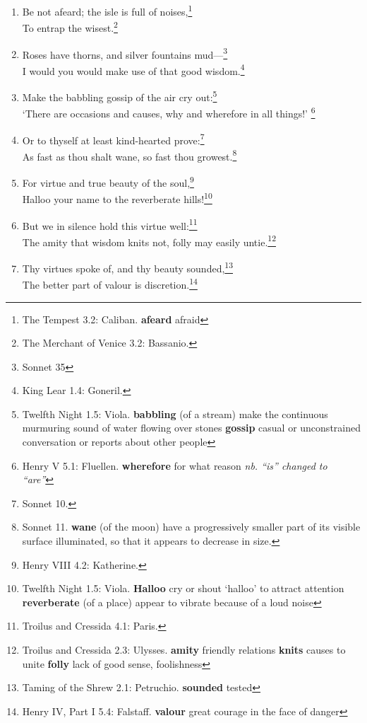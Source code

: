 \documentclass[17pt,twoside]{extarticle}
\begin{document}
\begin{enumerate}
  in such a temple.\footnote{The Tempest 1.2: Miranda.}
\item
  Be not afeard; the isle is full of noises,\footnote{The Tempest 3.2:
    Caliban. \textbf{afeard} afraid}\\To entrap the wisest.\footnote{The
    Merchant of Venice 3.2: Bassanio.}
\item
  Roses have thorns, and silver fountains mud---\footnote{Sonnet 35}\\I
  would you would make use of that good wisdom.\footnote{King Lear 1.4:
    Goneril.}
\item
  Make the babbling gossip of the air cry out:\footnote{Twelfth Night
    1.5: Viola. \textbf{babbling} (of a stream) make the continuous
    murmuring sound of water flowing over stones \textbf{gossip} casual
    or unconstrained conversation or reports about other people}\\`There
  are occasions and causes, why and wherefore in all things!' \footnote{Henry
    V 5.1: Fluellen. \textbf{wherefore} for what reason \emph{nb. ``is''
    changed to ``are''}}
\item
  Or to thyself at least kind-hearted prove:\footnote{Sonnet 10.}\\As
  fast as thou shalt wane, so fast thou growest.\footnote{Sonnet 11.
    \textbf{wane} (of the moon) have a progressively smaller part of its
    visible surface illuminated, so that it appears to decrease in size.}
\item
  For virtue and true beauty of the soul,\footnote{Henry VIII 4.2:
    Katherine.}\\Halloo your name to the reverberate hills!\footnote{Twelfth
    Night 1.5: Viola. \textbf{Halloo} cry or shout `halloo' to attract
    attention \textbf{reverberate} (of a place) appear to vibrate
    because of a loud noise}
\item
  But we in silence hold this virtue well:\footnote{Troilus and Cressida
    4.1: Paris.}\\The amity that wisdom knits not, folly may easily
  untie.\footnote{Troilus and Cressida 2.3: Ulysses. \textbf{amity}
    friendly relations \textbf{knits} causes to unite \textbf{folly}
    lack of good sense, foolishness}
\item
  Thy virtues spoke of, and thy beauty sounded,\footnote{Taming of the
    Shrew 2.1: Petruchio. \textbf{sounded} tested}\\The better part of
  valour is discretion.\footnote{Henry IV, Part I 5.4: Falstaff.
    \textbf{valour} great courage in the face of danger
}
\end{enumerate}
\end{document}
